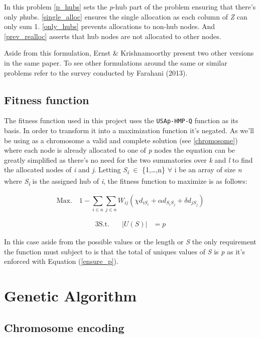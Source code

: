 \documentclass[onecolumn]{IEEEtran}
\newcommand{\ip}{\emph{p}}
\def\code#1{\texttt{#1}}
\def\point#1#2{\emph{#1\textsubscript{#2}}}
\begin{document}
In this problem \eqref{p_hubs} sets the \ip-hub part of the problem
ensuring that there's only \ip hubs. \eqref{single_alloc} ensures the single
allocation as each column of \emph{Z} can only sum 1. \eqref{only_hubs} prevents
allocations to non-hub nodes. And \eqref{prev_realloc} asserts that hub
nodes are not allocated to other nodes.

Aside from this formulation, Ernst \& Krishnamoorthy present two other versions in the
same paper\cite{Ernst1996}. To see other formulations around the same or similar problems
refer to the survey conducted by Farahani (2013)\cite{Farahani2013}.

\subsection{Fitness function}

The fitness function used in this project uses the \code{USAp-HMP-Q} function as its basis.
In order to transform it into a maximization function it's negated. As we'll be using as a
chromosome a valid and complete solution (see \ref{chromosome}) 
where each node is already allocated to one of \emph{p} nodes the equation can be greatly
simplified as there's no need for the two summatories over \emph{k} and \emph{l} to find the
allocated nodes of \emph{i} and \emph{j}. Letting \point{S}{i} $\in$ \{1,\dots,n\} $\forall$ i be an
array of size \emph{n} where \point{S}{i} is the assigned hub of \emph{i}, the fitness
function to maximize is as follows:


\[
  \text{Max.} \quad 1 - \sum_{i \in n} \sum_{j \in n} W_{ij} (\chi d_{iS_{i}} + \alpha d_{S_{i}S_{j}} + \delta d_{jS_{j}})
\]

\begin{alignat}{3}
  \text{S.t.} \quad & |U(S)|  &= p \label{ensure_p}
\end{alignat}

In this case aside from the possible values or the length or \emph{S} the only requirement
the function must subject to is that the total of uniques values of \emph{S} is \emph{p}
as it's enforced with Equation (\ref{ensure_p}).


\section{Genetic Algorithm}

\subsection{Chromosome encoding\label{chromosome}}
\end{document}
